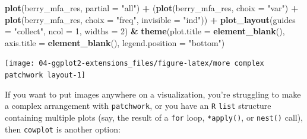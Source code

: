 \documentclass[
]{book}
\newenvironment{Shaded}{\begin{snugshade}}{\end{snugshade}}
\newcommand{\AttributeTok}[1]{\textcolor[rgb]{0.13,0.29,0.53}{#1}}
\newcommand{\ControlFlowTok}[1]{\textcolor[rgb]{0.13,0.29,0.53}{\textbf{#1}}}
\newcommand{\DecValTok}[1]{\textcolor[rgb]{0.00,0.00,0.81}{#1}}
\newcommand{\FloatTok}[1]{\textcolor[rgb]{0.00,0.00,0.81}{#1}}
\newcommand{\FunctionTok}[1]{\textcolor[rgb]{0.13,0.29,0.53}{\textbf{#1}}}
\newcommand{\NormalTok}[1]{#1}
\newcommand{\SpecialCharTok}[1]{\textcolor[rgb]{0.81,0.36,0.00}{\textbf{#1}}}
\newcommand{\StringTok}[1]{\textcolor[rgb]{0.31,0.60,0.02}{#1}}
\begin{document}
\begin{Shaded}
\begin{Highlighting}[]
\FunctionTok{plot}\NormalTok{(berry\_mfa\_res, }\AttributeTok{partial =} \StringTok{"all"}\NormalTok{) }\SpecialCharTok{+}
\NormalTok{  (}\FunctionTok{plot}\NormalTok{(berry\_mfa\_res, }\AttributeTok{choix =} \StringTok{"var"}\NormalTok{) }\SpecialCharTok{+}
  \FunctionTok{plot}\NormalTok{(berry\_mfa\_res, }\AttributeTok{choix =} \StringTok{"freq"}\NormalTok{, }\AttributeTok{invisible =} \StringTok{"ind"}\NormalTok{)) }\SpecialCharTok{+}
  \FunctionTok{plot\_layout}\NormalTok{(}\AttributeTok{guides =} \StringTok{"collect"}\NormalTok{, }\AttributeTok{ncol =} \DecValTok{1}\NormalTok{, }\AttributeTok{widths =} \DecValTok{2}\NormalTok{) }\SpecialCharTok{\&}
  \FunctionTok{theme}\NormalTok{(}\AttributeTok{plot.title =} \FunctionTok{element\_blank}\NormalTok{(),}
        \AttributeTok{axis.title =} \FunctionTok{element\_blank}\NormalTok{(),}
        \AttributeTok{legend.position =} \StringTok{"bottom"}\NormalTok{)}
\end{Highlighting}
\end{Shaded}

\begin{center}\texttt{[image: 04-ggplot2-extensions\_files/figure-latex/more complex patchwork layout-1]} \end{center}

If you want to put images anywhere on a visualization, you're struggling to make a complex arrangement with \texttt{patchwork}, or you have an \texttt{R} \texttt{list} structure containing multiple plots (say, the result of a \texttt{for} loop, \texttt{*apply()}, or \texttt{nest()} call), then \texttt{cowplot} is another option:

\begin{Shaded}
\end{Shaded}
\end{document}
